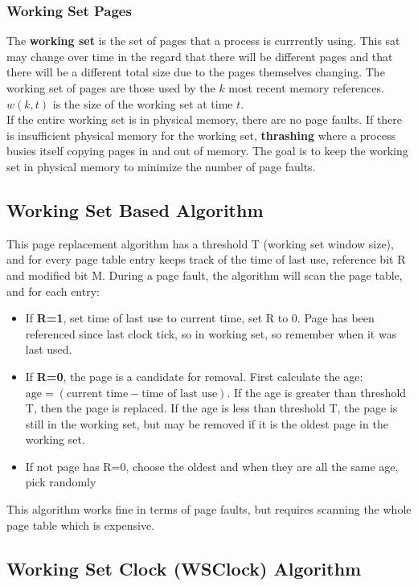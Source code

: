 \documentclass{article}
\newcommand{\bold}[1]{\textbf{#1}}
\renewcommand{\b}{\item[$\circ$]}
\newcommand{\newlist}{\begin{itemize}}
\renewcommand{\endlist}{\end{itemize}}
\begin{document}
\subsubsection{Working Set Pages}

The \bold{working set} is the set of pages that a process is currrently using. This sat may change over time in the regard that there will be different pages and that there will be a different total size due to the pages themselves changing. The working set of pages are those used by the $k$ most recent memory references. $w(k,t)$ is the size of the working set at time $t$. \\ 

If the entire working set is in physical memory, there are no page faults. If there is insufficient physical memory for the working set, \bold{thrashing} where a process busies itself copying pages in and out of memory. The goal is to keep the working set in physical memory to minimize the number of page faults. 

\subsection{Working Set Based Algorithm}

This page replacement algorithm has a threshold T (working set window size), and for every page table entry keeps track of the time of last use, reference bit R and modified bit M. During a page fault, the algorithm will scan the page table, and for each entry: 

\newlist 
\b If \bold{R=1}, set time of last use to current time, set R to 0. Page has been referenced since last clock tick, so in working set, so remember when it was last used. 
\b If \bold{R=0}, the page is a candidate for removal. First calculate the age: $\textrm{age} = (\textrm{current time} - \textrm{time of last use})$. If the age is greater than threshold T, then the page is replaced. If the age is less than threshold T, the page is still in the working set, but may be removed if it is the oldest page in the working set. 
\b If not page has R=0, choose the oldest and when they are all the same age, pick randomly
\endlist

This algorithm works fine in terms of page faults, but requires scanning the whole page table which is expensive. 

\subsection{Working Set Clock (WSClock) Algorithm}
\end{document}
